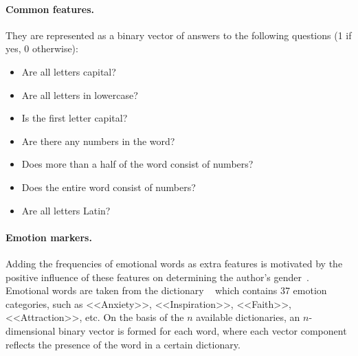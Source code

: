 \documentclass[a4paper,fleqn,longmktitle]{cas-dc}
\begin{document}
\paragraph{Common features.} They are represented as a binary vector of answers to the following questions (1 if yes, 0 otherwise):
\begin{itemize}
    \item Are all letters capital?
    \item Are all letters in lowercase?
    \item Is the first letter capital?
    \item Are there any numbers in the word?
    \item Does more than a half of the word consist of numbers?
    \item Does the entire word consist of numbers?
    \item Are all letters Latin?
\end{itemize}



\paragraph{Emotion markers.} Adding the frequencies of emotional words as extra features is motivated by the positive influence of these features on determining the author's gender~\cite{SueroMontero201498}.
Emotional words are taken from the dictionary%
~\cite{emofeelDicts} 
which contains 37 emotion categories, such as <<Anxiety>>, <<Inspiration>>, <<Faith>>, <<Attraction>>, etc.
On the basis of the $n$ available dictionaries, an $n$-dimensional binary vector is formed for each word, where each vector component reflects the presence of the word in a certain dictionary.
\end{document}
